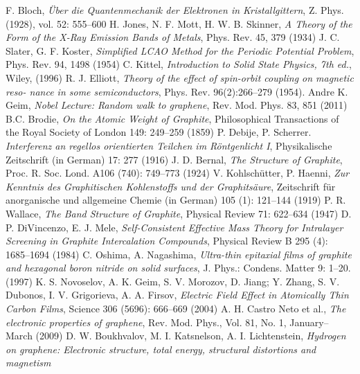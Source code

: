 \begin{thebibliography}{99}

 F. Bloch, \textit{Über die Quantenmechanik der Elektronen in Kristallgittern}, Z. Phys. (1928), vol. 52: 555–600
 H. Jones, N. F. Mott,  H. W. B. Skinner, \textit{A Theory of the Form of the X-Ray Emission Bands of Metals}, Phys. Rev. 45, 379 (1934)
 J. C. Slater, G. F. Koster, \textit{Simplified LCAO Method for the Periodic Potential Problem}, Phys. Rev. 94, 1498 (1954)
 C. Kittel, \textit{Introduction to Solid State Physics, 7th ed.}, Wiley, (1996) 
 R. J. Elliott, \textit{Theory of the effect of spin-orbit coupling on magnetic reso-
nance in some semiconductors}, Phys. Rev. 96(2):266–279 (1954).
 Andre K. Geim, \textit{Nobel Lecture: Random walk to graphene}, Rev. Mod. Phys. 83, 851 (2011)
 B.C. Brodie, \textit{On the Atomic Weight of Graphite},  Philosophical Transactions of the Royal Society of London 149: 249–259 (1859)
 P. Debije, P. Scherrer. \textit{Interferenz an regellos orientierten Teilchen im Röntgenlicht I}, Physikalische Zeitschrift (in German) 17: 277 (1916)
 J. D. Bernal, \textit{The Structure of Graphite}, Proc. R. Soc. Lond. A106 (740): 749–773 (1924)
 V. Kohlschütter, P. Haenni, \textit{Zur Kenntnis des Graphitischen Kohlenstoffs und der Graphitsäure}, Zeitschrift für anorganische und allgemeine Chemie (in German) 105 (1): 121–144  (1919)
 P. R. Wallace, \textit{The Band Structure of Graphite}, Physical Review 71: 622–634 (1947)
 D. P. DiVincenzo, E. J. Mele, \textit{Self-Consistent Effective Mass Theory for Intralayer Screening in Graphite Intercalation Compounds}, Physical Review B 295 (4): 1685–1694 (1984)
 C. Oshima, A. Nagashima, \textit{Ultra-thin epitaxial films of graphite and hexagonal boron nitride on solid surfaces}, J. Phys.: Condens. Matter 9: 1–20. (1997)
 K. S. Novoselov, A. K. Geim, S. V. Morozov, D. Jiang; Y. Zhang, S. V. Dubonos, I. V. Grigorieva, A. A. Firsov, \textit{Electric Field Effect in Atomically Thin Carbon Films}, Science 306 (5696): 666–669 (2004)
 A. H. Castro Neto et al., \textit{The electronic properties of graphene}, Rev. Mod. Phys., Vol. 81, No. 1, January–March (2009)
 D. W. Boukhvalov, M. I. Katsnelson, A. I. Lichtenstein, \textit{Hydrogen on graphene: Electronic structure, total energy, structural distortions and magnetism
}
\end{thebibliography}
